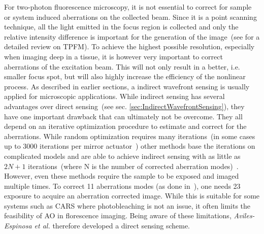 For two-photon fluorescence microscopy, it is not essential to correct for sample or system induced aberrations on the collected beam. Since it is a point scanning technique, all the light emitted in the focus region is collected and only the relative intensity difference is important for the generation of the image~(see \cite{scan_TPFM_review} for a detailed review on TPFM). To achieve the highest possible resolution, especially when imaging deep in a tissue, it is however very important to correct aberrations of the excitation beam. This will not only result in a better, i.e. smaller focus spot, but will also highly increase the efficiency of the nonlinear process. As described in earlier sections, a indirect wavefront sensing is usually applied for microscopic applications. While indirect sensing has several advantages over direct sensing~(see sec. \ref{sec:IndirectWavefrontSensing}), they have one important drawback that can ultimately not be overcome. They all depend on an iterative optimization procedure to estimate and correct for the aberrations. While random optimization requires many iterations~(in some cases up to 3000 iterations per mirror actuator~\cite{scan_CARS}) other methods base the iterations on complicated models and are able to achieve indirect sensing with as little as $2N+1$ iterations~(where N is the number of corrected aberration modes)~\cite{wide_AOM_loew_freq,wide_AOM_structured_illu,scan_TPFM_image_based}. However, even these methods require the sample to be exposed and imaged multiple times. To correct 11 aberrations modes (as done in~\cite{scan_TPFM_image_based}), one needs 23 exposure to acquire an aberration corrected image. While this is suitable for some systems such as CARS where photobleaching is not an issue, it often limits the feasibility of AO in florescence imaging. Being aware of these limitations, \emph{Aviles-Espinosa et al.} therefore developed a direct sensing scheme. 

